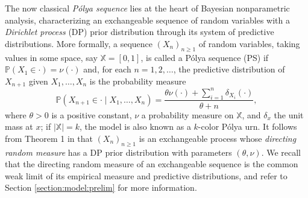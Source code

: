 \documentclass[a4paper]{article}
\theoremstyle{plain}
\theoremstyle{remark}
\theoremstyle{definition}
\newcommand{\Polya}{P\'{o}lya }
\begin{document}
The now classical \textit{\Polya sequence} lies at the heart of Bayesian nonparametric analysis, characterizing an exchangeable sequence of random variables with a \textit{Dirichlet process} (DP) prior distribution through its system of predictive distributions. More formally, a sequence $(X_n)_{n\geq1}$ of random variables, taking values in some space, say $\mathbb{X}=[0,1]$, is called a \Polya sequence (PS) if $\mathbb{P}(X_1\in\cdot)=\nu(\cdot)$ and, for each $n=1,2,\ldots$, the predictive distribution of $X_{n+1}$ given $X_1,\ldots,X_n$ is the probability measure
\begin{equation}\label{eq:intro:polya_sequence}
\mathbb{P}(X_{n+1}\in\cdot\mid X_1,\ldots,X_n)=\frac{\theta\nu(\cdot)+\sum_{i=1}^n\delta_{X_i}(\cdot)}{\theta+n},
\end{equation}
where $\theta>0$ is a positive constant, $\nu$ a probability measure on $\mathbb{X}$, and $\delta_x$ the unit mass at $x$; if $|\mathbb{X}|=k$, the model is also known as a $k$-color \Polya urn. It follows from Theorem 1 in \cite{blackwell1973ferguson} that $(X_n)_{n\geq1}$ is an exchangeable process whose \textit{directing random measure} has a DP prior distribution with parameters $(\theta,\nu)$. We recall that the directing random measure of an exchangeable sequence is the common weak limit of its empirical measure and predictive distributions, and refer to Section \ref{section:model:prelim} for more information.
\end{document}
